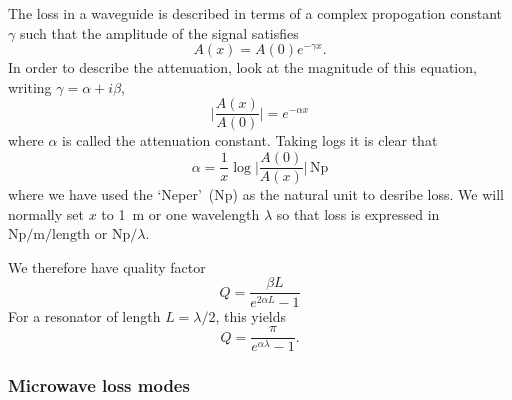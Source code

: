 The loss in a waveguide is described in terms of a complex propogation
constant~\cite{Collin2007} $\gamma$ such that the amplitude of the signal
satisfies
\begin{equation}
  A(x) = A(0)e^{-\gamma x}.
\end{equation}
In order to describe the attenuation, look at the magnitude of this equation,
writing $\gamma = \alpha +i\beta$,
\begin{equation}
  \lvert\frac{A(x)}{A(0)}\rvert = e^{-\alpha x}
\end{equation}
where $\alpha$ is called the attenuation constant. Taking logs it is clear that
\begin{equation}
  \alpha = \frac{1}{x}\log\lvert\frac{A(0)}{A(x)}\rvert\,\si{\neper}
\end{equation}
where we have used the `Neper'~(\si{\neper})  as the natural unit
to desribe loss. We will normally set $x$ to 
\SI{1}{\meter} or one wavelength $\lambda$ so that loss is expressed in
$\si{\neper \per \meter}/\mathrm{length}$ or $\si{\neper}/\lambda$.
%
%

We therefore have quality factor
\begin{equation}
  Q = \frac{\beta L}{e^{2\alpha L} -1}
\end{equation}
For a resonator of length $L = \lambda/2$, this yields
\begin{equation}
  Q = \frac{\pi}{e^{\alpha \lambda} - 1}.
\end{equation}


\subsubsection{Microwave loss modes}

